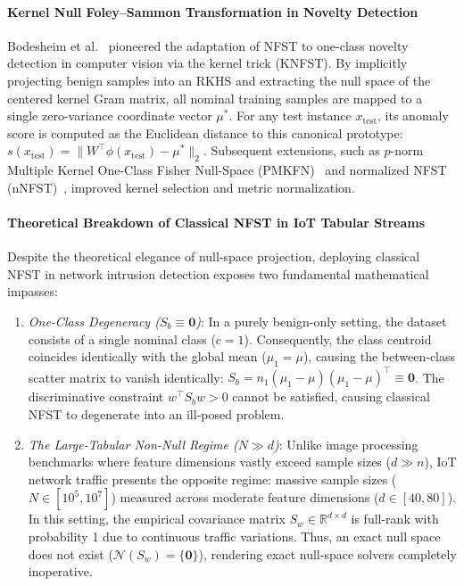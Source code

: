 \paragraph{Kernel Null Foley--Sammon Transformation in Novelty Detection}
Bodesheim et al.~\cite{bodesheim2013kernel} pioneered the adaptation of NFST to one-class novelty detection in computer vision via the kernel trick (KNFST). By implicitly projecting benign samples into an RKHS and extracting the null space of the centered kernel Gram matrix, all nominal training samples are mapped to a single zero-variance coordinate vector $\mu^*$. For any test instance $x_{\text{test}}$, its anomaly score is computed as the Euclidean distance to this canonical prototype: $s(x_{\text{test}}) = \|W^\top \phi(x_{\text{test}}) - \mu^*\|_2$. Subsequent extensions, such as $p$-norm Multiple Kernel One-Class Fisher Null-Space (PMKFN)~\cite{arashloo2020p} and normalized NFST (nNFST)~\cite{nguyen2025nnfst}, improved kernel selection and metric normalization.

\paragraph{Theoretical Breakdown of Classical NFST in IoT Tabular Streams}
Despite the theoretical elegance of null-space projection, deploying classical NFST in network intrusion detection exposes two fundamental mathematical impasses:
\begin{enumerate}[label=(\roman*)]
    \item \emph{One-Class Degeneracy ($S_b \equiv \mathbf{0}$)}: In a purely benign-only setting, the dataset consists of a single nominal class ($c = 1$). Consequently, the class centroid coincides identically with the global mean ($\mu_1 = \mu$), causing the between-class scatter matrix to vanish identically: $S_b = n_1 (\mu_1 - \mu)(\mu_1 - \mu)^\top \equiv \mathbf{0}$. The discriminative constraint $w^\top S_b w > 0$ cannot be satisfied, causing classical NFST to degenerate into an ill-posed problem.
    \item \emph{The Large-Tabular Non-Null Regime ($N \gg d$)}: Unlike image processing benchmarks where feature dimensions vastly exceed sample sizes ($d \gg n$), IoT network traffic presents the opposite regime: massive sample sizes ($N \in [10^5, 10^7]$) measured across moderate feature dimensions ($d \in [40, 80]$). In this setting, the empirical covariance matrix $S_w \in \mathbb{R}^{d \times d}$ is full-rank with probability 1 due to continuous traffic variations. Thus, an exact null space does not exist ($\mathcal{N}(S_w) = \{\mathbf{0}\}$), rendering exact null-space solvers completely inoperative.
\end{enumerate}

